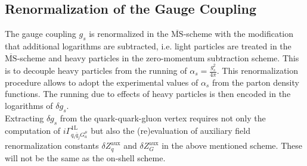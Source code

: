 \subsection{Renormalization of the Gauge Coupling}\label{sec:RenGaugeCoupling}
The gauge coupling $g_s$ is renormalized in the $\overline{\mathrm{MS}}$-scheme with the modification that additional logarithms are subtracted, i.e. light particles are treated in the $\overline{\mathrm{MS}}$-scheme and heavy particles in the zero-momentum subtraction scheme. This is to decouple heavy particles from the running of $\alpha_s = \frac{g_s^2}{4\pi}$. This renormalization procedure allows to adopt the experimental values of $\alpha_s$ from the parton density functions. The running due to effects of heavy particles is then encoded in the logarithms of $\delta g_s$.\\
Extracting $\delta g_s$ from the quark-quark-gluon vertex requires not only the computation of $i\Gamma^{\mathrm{1L}}_{q_i\overline{q}_jG^\mu_a}$ but also the (re)evaluation of auxiliary field renormalization constants $\delta Z_q^{\mathrm{aux}}$ and $\delta Z_G^{\mathrm{aux}}$ in the above mentioned scheme. These will not be the same as the on-shell scheme.

